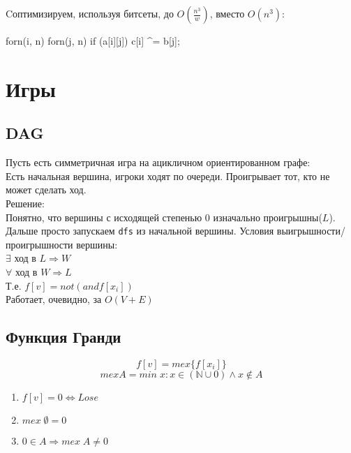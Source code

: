 Cоптимизируем, используя битсеты, до $O(\frac{n^3}{w})$, вместо $O(n^3)$:
\begin{cppcode}
forn(i, n) {
    forn(j, n) {
        if (a[i][j]) {
            c[i] ^= b[j];
        }
    }
}
\end{cppcode}

\section{Игры}

\subsection{DAG}
Пусть есть симметричная игра на ацикличном ориентированном графе:\\
Есть начальная вершина, игроки ходят по очереди. Проигрывает тот, кто не может сделать ход.\\

Решение:\\
Понятно, что вершины с исходящей степенью 0 изначально проигрышны($L$). Дальше просто запускаем \texttt{dfs} из начальной вершины.
Условия выигрышности/проигрышности вершины:\\
$\exists$ ход в $L \Rightarrow W$\\
$\forall$ ход в $W \Rightarrow L$\\
Т.е. $f[v] = not(and f[x_i])$\\

Работает, очевидно, за $O(V + E)$\\

\subsection{Функция Гранди}

\begin{Def}
$$ f[v] = mex \{f[x_i]\} $$
$$ mex A = min \; x: x \in (\mathbb{N} \cup 0) \wedge x \notin A $$
\end{Def}

\begin{Rem}
\begin{enumerate}
\item $f[v] = 0 \Leftrightarrow Lose$
\item $mex \; \emptyset = 0$
\item $0 \in A \Rightarrow mex \; A \neq 0$
\end{enumerate}
\end{Rem}


